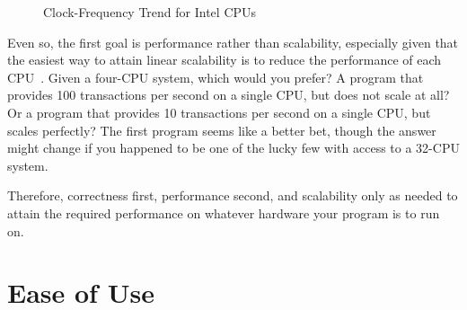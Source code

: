 \begin{figure}[htb]
\begin{center}
\end{center}
\caption{Clock-Frequency Trend for Intel CPUs}
\label{fig:intro:Clock-Frequency Trend for Intel CPUs}
\end{figure}

Even so, the first goal is performance rather than scalability,
especially given that the easiest way to attain linear scalability
is to reduce the performance of each CPU~\cite{LinusTorvalds2001a}.
Given a four-CPU system, which would you prefer?
A program that provides 100 transactions per second on a single CPU,
but does not scale at all?
Or a program that provides 10 transactions per second on a single CPU,
but scales perfectly?
The first program seems like a better bet, though the answer might
change if you happened to be one of the lucky few with access to a
32-CPU system.

Therefore, correctness first, performance second,
and scalability only as needed to
attain the required performance on whatever hardware your program
is to run on.




\section{Ease of Use}
\label{sec:intro:Ease of Use}

